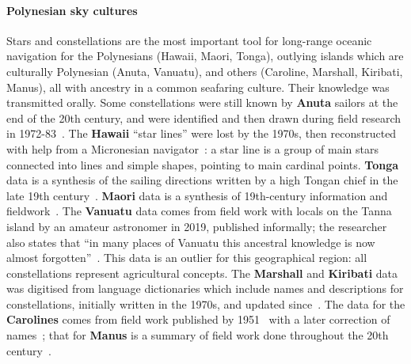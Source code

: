 \documentclass[10pt]{article}
\begin{document}
\paragraph{Polynesian sky cultures} Stars and constellations are the most important tool for long-range oceanic navigation for the Polynesians (Hawaii, Maori, Tonga), outlying islands which are culturally Polynesian (Anuta, Vanuatu), and others (Caroline, Marshall, Kiribati, Manus), all with ancestry in a common seafaring culture. Their knowledge was transmitted orally. Some constellations were still known by {\bf Anuta} sailors at the end of the 20th century, and were identified and then drawn during field research in 1972-83~\cite{feinberg1988polynesian}. The {\bf Hawaii} ``star lines'' were lost by the 1970s, then reconstructed with help from a Micronesian navigator~\cite{HSL}: a star line is a group of main stars connected into lines and simple shapes, pointing to main cardinal points. {\bf Tonga} data is a synthesis of the sailing directions written by a high Tongan chief in the late 19th century~\cite{collocott1922tongan}. {\bf Maori} data is a synthesis of 19th-century information and fieldwork~\cite{orchiston2000polynesian}. The {\bf Vanuatu} data comes from field work with locals on the Tanna island by an amateur astronomer in 2019, published informally; the researcher also states that ``in many places of Vanuatu this ancestral knowledge is now almost forgotten''~\cite{DMR}. This data is an outlier for this geographical region: all constellations represent agricultural concepts. The {\bf Marshall} and {\bf Kiribati} data was digitised from language dictionaries which include names and descriptions for constellations, initially written in the 1970s, and updated since~\cite{MEOO,KED}. The data for the {\bf Carolines} comes from field work published by 1951~\cite{goodenough1951native} with a later correction of names~\cite{holton2015east}; that for {\bf Manus} is a summary of field work done throughout the 20th century~\cite{hoeppe2000shark}.
\end{document}
